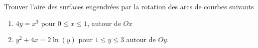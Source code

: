 \begin{exercice}\label{exoInter0014}

Trouver l'aire des surfaces engendrées par la rotation des arcs de courbes suivants
\begin{enumerate}

\item
$4y=x^3$ pour $0\leq x\leq 1$, autour de $Ox$
\item
$y^2+4x=2\ln(y)$ pour $1\leq y\leq 3$ autour de $Oy$.

\end{enumerate}

\end{exercice}

